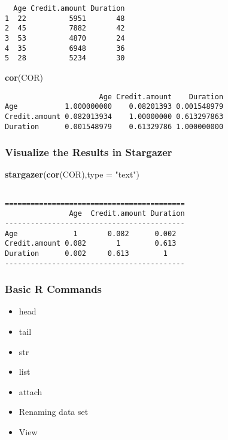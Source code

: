 \documentclass[
]{article}
\newenvironment{Shaded}{\begin{snugshade}}{\end{snugshade}}
\newcommand{\AttributeTok}[1]{\textcolor[rgb]{0.13,0.29,0.53}{#1}}
\newcommand{\FunctionTok}[1]{\textcolor[rgb]{0.13,0.29,0.53}{\textbf{#1}}}
\newcommand{\NormalTok}[1]{#1}
\newcommand{\StringTok}[1]{\textcolor[rgb]{0.31,0.60,0.02}{#1}}
\providecommand{\tightlist}{%
  \setlength{\itemsep}{0pt}\setlength{\parskip}{0pt}}
\begin{document}
\begin{verbatim}
  Age Credit.amount Duration
1  22          5951       48
2  45          7882       42
3  53          4870       24
4  35          6948       36
5  28          5234       30
\end{verbatim}

\begin{Shaded}
\begin{Highlighting}[]
\FunctionTok{cor}\NormalTok{(COR)}
\end{Highlighting}
\end{Shaded}

\begin{verbatim}
                      Age Credit.amount    Duration
Age           1.000000000    0.08201393 0.001548979
Credit.amount 0.082013934    1.00000000 0.613297863
Duration      0.001548979    0.61329786 1.000000000
\end{verbatim}

\hypertarget{visualize-the-results-in-stargazer}{%
\subsubsection{Visualize the Results in
Stargazer}\label{visualize-the-results-in-stargazer}}

\begin{Shaded}
\begin{Highlighting}[]
\FunctionTok{stargazer}\NormalTok{(}\FunctionTok{cor}\NormalTok{(COR),}\AttributeTok{type =} \StringTok{"text"}\NormalTok{)}
\end{Highlighting}
\end{Shaded}

\begin{verbatim}

==========================================
               Age  Credit.amount Duration
------------------------------------------
Age             1       0.082      0.002  
Credit.amount 0.082       1        0.613  
Duration      0.002     0.613        1    
------------------------------------------
\end{verbatim}

\hypertarget{basic-r-commands}{%
\subsubsection{Basic R Commands}\label{basic-r-commands}}

\begin{itemize}
\tightlist
\item
  head
\item
  tail
\item
  str
\item
  list
\item
  attach
\item
  Renaming data set
\item
  View
\end{itemize}
\end{document}
